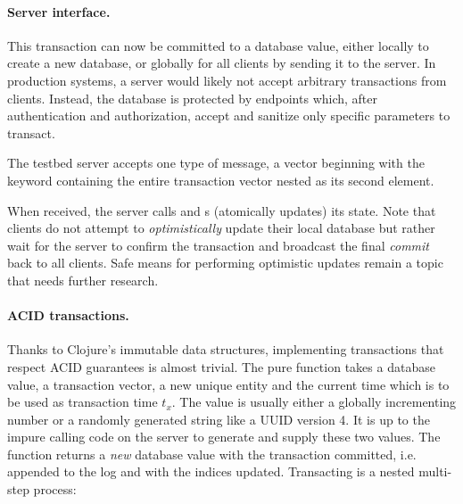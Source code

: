 \paragraph{Server interface.}
This transaction can now be committed to a database value, either locally to create a new database, or globally for all clients by sending it to the server. In production systems, a server would likely not accept arbitrary transactions from clients. Instead, the database is protected by endpoints which, after authentication and authorization, accept and sanitize only specific parameters to transact.

The testbed server accepts one type of message, a vector beginning with the keyword  containing the entire transaction vector nested as its second element.

\begin{center}
\end{center}

When received, the server calls  and s (atomically updates) its state. Note that clients do not attempt to \emph{optimistically} update their local database but rather wait for the server to confirm the transaction and broadcast the final \emph{commit} back to all clients. Safe means for performing optimistic updates remain a topic that needs further research.

\paragraph{ACID transactions.}
Thanks to Clojure's immutable data structures, implementing transactions that respect \gls{ACID} guarantees is almost trivial.
The pure function  takes a database value, a transaction vector, a new unique entity  and the current time which is to be used as transaction time $t_x$. The  value is usually either a globally incrementing number or a randomly generated string like a \gls{UUID} version 4. It is up to the impure calling code on the server to generate and supply these two values. The  function returns a \emph{new} database value with the transaction committed, i.e. appended to the log and with the indices updated. Transacting is a nested multi-step process:

